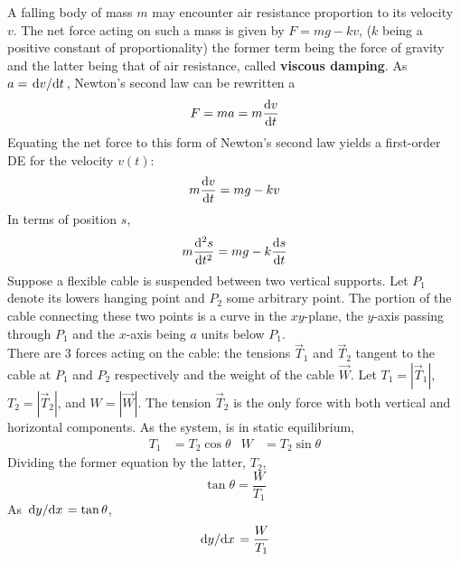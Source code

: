 \documentclass[../Differential Equations.tex]{subfiles}
\begin{document}
			A falling body of mass \(m\) may encounter air resistance proportion to its velocity \(v\). The net force acting on such a mass is given by \(F = mg - kv\), (\(k\) being a positive constant of proportionality) the former term being the force of gravity and the latter being that of air resistance, called \textbf{viscous damping}. As \(a = \dv*{v}{t}\), Newton's second law can be rewritten a
				\[F = ma = m\dv{v}{t}\]
				Equating the net force to this form of Newton's second law yields a first-order DE for the velocity \(v(t)\):
				\[m\dv{v}{t} = mg - kv\]
				In terms of position \(s\),
				\[m\dv[2]{s}{t} = mg - k\dv{s}{t}\]
			Suppose a flexible cable is suspended between two vertical supports. Let \(P_1\) denote its lowers hanging point and \(P_2\) some arbitrary point. The portion of the cable connecting these two points is a curve in the \(xy\)-plane, the \(y\)-axis passing through \(P_1\) and the \(x\)-axis being \(a\) units below \(P_1\). \\
			There are 3 forces acting on the cable: the tensions \(\vec{T}_1\) and \(\vec{T}_2\) tangent to the cable at \(P_1\) and \(P_2\) respectively and the weight of the cable \(\vec{W}\). Let \(T_1 = |\vec{T}_1|\), \(T_2 = |\vec{T}_2|\), and \(W = |\vec{W}|\). The tension \(\vec{T}_2\) is the only force with both vertical and horizontal components. As the system, is in static equilibrium,
			\begin{align*}
				T_1 &= T_2\cos\theta &
					W &= T_2\sin\theta
			\end{align*}
			Dividing the former equation by the latter, \(T_2\),
			\[\tan\theta = \frac{W}{T_1}\]
			As \(\dv*{y}{x} = \tan\theta\), 
				\[\dv*{y}{x} = \frac{W}{T_1}\]
\end{document}
